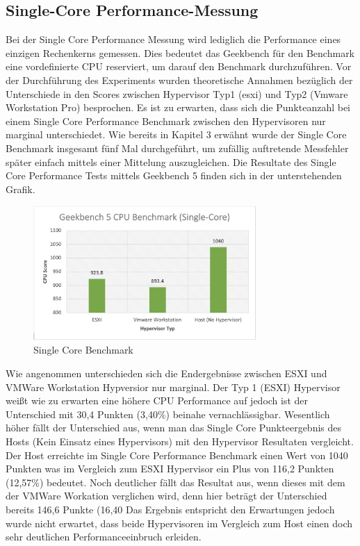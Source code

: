 \documentclass[conference]{IEEEtran}
\begin{document}
\subsection{Single-Core Performance-Messung}
Bei der Single Core Performance Messung wird lediglich die Performance eines einzigen Rechenkerns gemessen. Dies bedeutet das Geekbench für den Benchmark eine vordefinierte CPU reserviert, um darauf den Benchmark durchzuführen. Vor der Durchführung des Experiments wurden theoretische Annahmen bezüglich der Unterschiede in den Scores zwischen Hypervisor Typ1 (esxi) und Typ2 (Vmware Workstation Pro) besprochen. Es ist zu erwarten, dass sich die Punkteanzahl bei einem Single Core Performance Benchmark zwischen den Hypervisoren nur marginal unterschiedet.
Wie bereits in Kapitel 3 erwähnt wurde der Single Core Benchmark insgesamt fünf Mal durchgeführt, um zufällig auftretende Messfehler später einfach mittels einer Mittelung auszugleichen. Die Resultate des Single Core Performance Tests mittels Geekbench 5 finden sich in der unterstehenden Grafik. \newline 

\begin{figure}
	\centering
	\includegraphics[keepaspectratio,width=8.5cm,height=0.75\textheight]{singlecore.png}
	\caption{Single Core Benchmark}
	\label{architecture}
\end{figure}

Wie angenommen unterschieden sich die Endergebnisse zwischen ESXI und VMWare Workstation Hypversior nur marginal. Der Typ 1 (ESXI) Hypervisor weißt wie zu erwarten eine höhere CPU Performance auf jedoch ist der Unterschied mit 30,4 Punkten (3,40\%) beinahe vernachlässigbar. Wesentlich höher fällt der Unterschied aus, wenn man das Single Core Punkteergebnis des Hosts (Kein Einsatz eines Hypervisors) mit den Hypervisor Resultaten vergleicht. Der Host erreichte im Single Core Performance Benchmark einen Wert von 1040 Punkten was im Vergleich zum ESXI Hypervisor ein Plus von 116,2 Punkten (12,57\%) bedeutet. Noch deutlicher fällt das Resultat aus, wenn dieses mit dem der VMWare Workation verglichen wird, denn hier beträgt der Unterschied bereits 146,6 Punkte (16,40%
Das Ergebnis entspricht den Erwartungen jedoch wurde nicht erwartet, dass beide Hypervisoren im Vergleich zum Host einen doch sehr deutlichen Performanceeinbruch erleiden.
\end{document}
